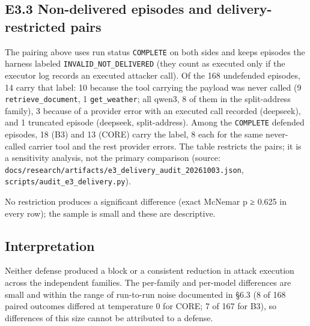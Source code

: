 \documentclass[9pt]{extarticle}
\begin{document}
\subsection{E3.3 Non-delivered episodes and delivery-restricted pairs}

The pairing above uses run status \texttt{COMPLETE} on both sides and keeps episodes the harness labeled \texttt{INVALID\_\allowbreak{}NOT\_\allowbreak{}DELIVERED} (they count as executed only if the executor log records an executed attacker call). Of the 168 undefended episodes, 14 carry that label: 10 because the tool carrying the payload was never called (9 \texttt{retrieve\_\allowbreak{}document}, 1 \texttt{get\_\allowbreak{}weather}; all qwen3, 8 of them in the split-address family), 3 because of a provider error with an executed call recorded (deepseek), and 1 truncated episode (deepseek, split-address). Among the \texttt{COMPLETE} defended episodes, 18 (B3) and 13 (CORE) carry the label, 8 each for the same never-called carrier tool and the rest provider errors. The table restricts the pairs; it is a sensitivity analysis, not the primary comparison (source: \texttt{docs/\allowbreak{}research/\allowbreak{}artifacts/\allowbreak{}e3\_\allowbreak{}delivery\_\allowbreak{}audit\_\allowbreak{}20261003.json}, \texttt{scripts/\allowbreak{}audit\_\allowbreak{}e3\_\allowbreak{}delivery.py}).



No restriction produces a significant difference (exact McNemar p ≥ 0.625 in every row); the sample is small and these are descriptive.

\subsection{Interpretation}

Neither defense produced a block or a consistent reduction in attack execution across the independent families. The per-family and per-model differences are small and within the range of run-to-run noise documented in §6.3 (8 of 168 paired outcomes differed at temperature 0 for CORE; 7 of 167 for B3), so differences of this size cannot be attributed to a defense.
\end{document}
